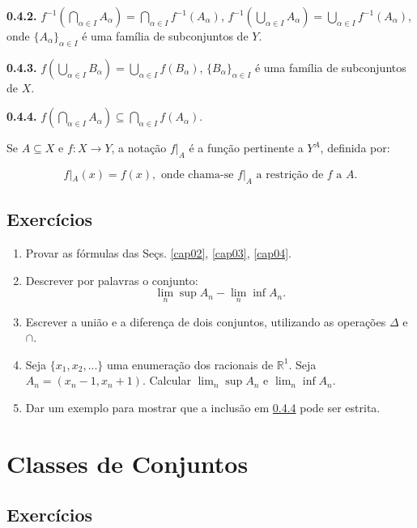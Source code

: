 \documentclass[
]{book}
\providecommand{\tightlist}{%
  \setlength{\itemsep}{0pt}\setlength{\parskip}{0pt}}
\begin{document}
\textbf{0.4.2.} \(f^{-1}(\bigcap\limits_{\alpha \in I} A_{\alpha}) = \bigcap\limits_{\alpha \in I} f^{-1}(A_{\alpha})\), \(f^{-1}(\bigcup\limits_{\alpha \in I} A_{\alpha}) = \bigcup\limits_{\alpha \in I} f^{-1}(A_{\alpha})\), onde \(\{A_{\alpha}\}_{\alpha \in I}\) é uma família de subconjuntos de \(Y\).

\textbf{0.4.3.} \(f(\bigcup\limits_{\alpha \in I} B_{\alpha}) = \bigcup\limits_{\alpha \in I} f(B_{\alpha})\), \(\{B_{\alpha}\}_{\alpha \in I}\) é uma família de subconjuntos de \(X\).

\textbf{0.4.4.} \(f(\bigcap\limits_{\alpha \in I} A_{\alpha}) \subseteq \bigcap\limits_{\alpha \in I} f(A_{\alpha})\).

Se \(A \subseteq X\) e \(f: X \to Y\), a notação \(f|_A\) é a função pertinente a \(Y^A\), definida por:

\[f|_A(x) = f(x), \text{ onde chama-se } f|_A \text{ a restrição de } f \text{ a } A.\]

\section*{Exercícios}\label{exercuxedcios}

\begin{enumerate}
\def\labelenumi{\arabic{enumi}.}
\tightlist
\item
  Provar as fórmulas das Seçs. \ref{cap02}, \ref{cap03}, \ref{cap04}.
\item
  Descrever por palavras o conjunto: \[ \lim_n \sup A_n - \lim_n \inf A_n. \]
\item
  Escrever a união e a diferença de dois conjuntos, utilizando as operações \(\Delta\) e \(\cap\).
\item
  Seja \(\{x_1, x_2, ...\}\) uma enumeração dos racionais de \(\mathbb{R}^1\). Seja \(A_n = (x_n-1, x_n+1)\). Calcular \(\lim_n \sup A_n\) e \(\lim_n \inf A_n\).
\item
  Dar um exemplo para mostrar que a inclusão em \hyperref[cap04]{0.4.4} pode ser estrita.
\end{enumerate}

\chapter{Classes de Conjuntos}\label{classes-de-conjuntos}

\section*{Exercícios}\label{exercuxedcios-1}
\end{document}
